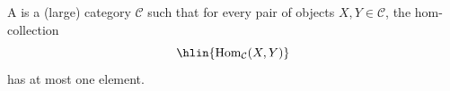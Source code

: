 \begin{definition} \label{definition:thin_category}
A  is a (large) category $\mathcal{C}$ such that for every pair of objects $X,Y \in \mathcal{C}$, the hom-collection
$$\hlin{\mathrm{Hom}_{\mathcal{C}}(X,Y)}$$
has at most one element.
\end{definition}